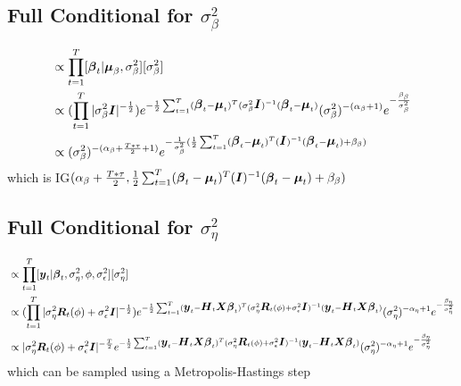 \documentclass[fleqn]{article}
\def\bm#1{\mbox{\boldmath $#1$}}
\begin{document}
\subsection{Full Conditional for $\sigma^2_\beta$}
%
\begin{align*}
[\sigma^2_\beta | \cdot] & \propto \prod_{t = 1}^T [\bm{\beta}_t | \bm{\mu}_\beta, \sigma^2_\beta] [\sigma^2_\beta]\\
%
& \propto (\prod_{t = 1}^T |\sigma^2_{\beta} \bm{I}|^{ - \frac{1} {2}}) e^{ - \frac{1} {2} \sum_{t = 1}^T (\bm{\beta}_t - \bm{\mu}_t)^T (\sigma^2_\beta \bm{I})^{ - 1} (\bm{\beta}_t - \bm{\mu}_t)} (\sigma^2_\beta)^{ - (\alpha_\beta + 1)} e^{ - \frac{\beta_\beta} {\sigma^2_\beta}}\\
%
& \propto (\sigma^2_\beta)^{ - (\alpha_\beta + \frac{T * \tau} {2} + 1)} e^{ - \frac{1} {\sigma^2_\beta} (\frac{1} {2} \sum_{t = 1}^T (\bm{\beta}_t - \bm{\mu}_t)^T (\bm{I})^{ - 1} (\bm{\beta}_t - \bm{\mu}_t) + \beta_\beta)}
\end{align*}
%
which is IG$(\alpha_\beta + \frac{T * \tau} {2}, \frac{1} {2} \sum_{t = 1}^T (\bm{\beta}_t - \bm{\mu}_t)^T (\bm{I})^{ - 1} (\bm{\beta}_t - \bm{\mu}_t) + \beta_\beta)$
%
%
\subsection{Full Conditional for $\sigma^2_\eta$}
%
\begin{align*}
[\sigma^2_\eta | \cdot] & \propto \prod_{t = 1}^T [\bm{y}_t | \bm{\beta}_t, \sigma^2_\eta, \phi, \sigma^2_\epsilon] [\sigma^2_\eta]\\
%
& \propto (\prod_{t = 1}^T |\sigma^2_\eta \bm{R}_t(\phi) + \sigma^2_\epsilon \bm{I} |^{ - \frac{1} {2}}) e^{ - \frac{1} {2} \sum_{t = 1}^T (\bm{y}_t - \bm{H}_t \bm{X} \bm{\beta}_t)^T (\sigma^2_\eta \bm{R}_t(\phi) + \sigma^2_\epsilon \bm{I})^{ - 1} (\bm{y}_t - \bm{H}_t \bm{X} \bm{\beta}_t)} (\sigma^2_\eta)^{ - \alpha_\eta + 1} e^{ - \frac{\beta_\eta} {\sigma^2_\eta}}\\
%
& \propto |\sigma^2_\eta \bm{R}_t(\phi) + \sigma^2_\epsilon \bm{I} |^{ - \frac{T} {2}} e^{ - \frac{1} {2} \sum_{t = 1}^T (\bm{y}_t - \bm{H}_t \bm{X} \bm{\beta}_t)^T (\sigma^2_\eta \bm{R}_t(\phi) + \sigma^2_\epsilon \bm{I})^{ - 1} (\bm{y}_t - \bm{H}_t \bm{X} \bm{\beta}_t)} (\sigma^2_\eta)^{ - \alpha_\eta + 1} e^{ - \frac{\beta_\eta} {\sigma^2_\eta}}\\
\end{align*}
% 
which can be sampled using a Metropolis-Hastings step
%
\end{document}
